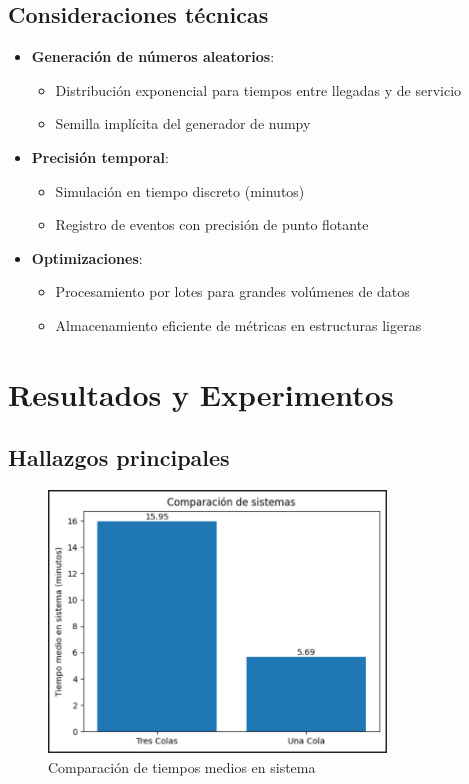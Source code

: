 \documentclass{article}
\begin{document}
\subsection{Consideraciones técnicas}
\begin{itemize}
    \item \textbf{Generación de números aleatorios}:
    \begin{itemize}
        \item Distribución exponencial para tiempos entre llegadas y de servicio
        \item Semilla implícita del generador de numpy
    \end{itemize}

    \item \textbf{Precisión temporal}:
        \begin{itemize}
            \item Simulación en tiempo discreto (minutos)
            \item Registro de eventos con precisión de punto flotante
        \end{itemize}

    \item \textbf{Optimizaciones}:
        \begin{itemize}
            \item Procesamiento por lotes para grandes volúmenes de datos
            \item Almacenamiento eficiente de métricas en estructuras ligeras
        \end{itemize}
\end{itemize}

\newpage

\section{Resultados y Experimentos}\label{sec:resultados}

\subsection{Hallazgos principales}
\begin{figure}[h]
\centering
\includegraphics[width=0.8\textwidth]{./images/comparacion_colas.png}
\caption{Comparación de tiempos medios en sistema}
\label{fig:resultados}
\end{figure}
\end{document}
